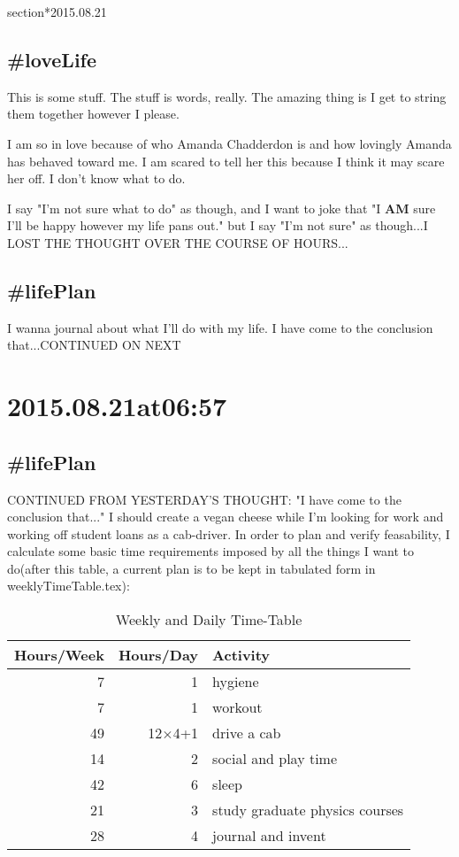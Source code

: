 section*{2015.08.21}

\subsection*{\#loveLife}
This is some stuff. The stuff is words, really. The amazing thing is I get to string them together however I please.

I am so in love because of who Amanda Chadderdon is and how lovingly Amanda has behaved toward me. I am scared to tell her this because I think it may scare her off. I don't know what to do.

I say "I'm not sure what to do" as though, and I want to joke that "I \textbf{AM} sure I'll be happy however my life pans out." but I say "I'm not sure" as though...I LOST THE THOUGHT OVER THE COURSE OF HOURS...

\subsection*{\#lifePlan}
I wanna journal about what I'll do with my life. I have come to the conclusion that...CONTINUED ON NEXT

\section*{2015.08.21at06:57}
\subsection*{\#lifePlan} CONTINUED FROM YESTERDAY'S THOUGHT:
"I have come to the conclusion that..." I should create a vegan cheese while I'm looking for work and working off student loans as a cab-driver. In order to plan and verify feasability, I calculate some basic time requirements imposed by all the things I want to do(after this table, a current plan is to be kept in tabulated form in weeklyTimeTable.tex):

\begin{table}
\caption{\label{tab:originalWeeklyAndDailyTimeTable}Weekly and Daily Time-Table}
\begin{tabular}{|r|r|l|}
\hline
Hours/Week&Hours/Day&Activity\\
\hline
7&1&hygiene\\
7&1&workout\\
49&12$\times$4+1&drive a cab\\
14&2&social and play time\\
42&6&sleep\\
21&3&study graduate physics courses\\
28&4&journal and invent\\
\hline
\end{tabular}\end{table}

